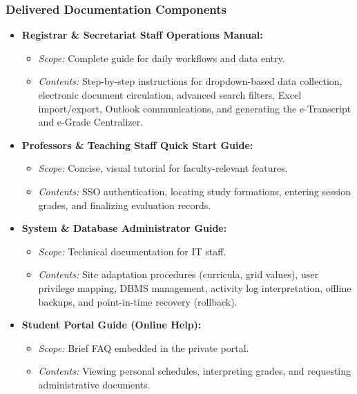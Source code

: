\documentclass[11pt, a4paper]{article}
\begin{document}
\subsubsection{Delivered Documentation Components}
\begin{itemize}
    \item \textbf{Registrar \& Secretariat Staff Operations Manual:}
    \begin{itemize}
        \item \textit{Scope:} Complete guide for daily workflows and data entry.
        \item \textit{Contents:} Step-by-step instructions for dropdown-based data collection, electronic document circulation, advanced search filters, Excel import/export, Outlook communications, and generating the e-Transcript and e-Grade Centralizer.
    \end{itemize}
    \item \textbf{Professors \& Teaching Staff Quick Start Guide:}
    \begin{itemize}
        \item \textit{Scope:} Concise, visual tutorial for faculty-relevant features.
        \item \textit{Contents:} SSO authentication, locating study formations, entering session grades, and finalizing evaluation records.
    \end{itemize}
    \item \textbf{System \& Database Administrator Guide:}
    \begin{itemize}
        \item \textit{Scope:} Technical documentation for IT staff.
        \item \textit{Contents:} Site adaptation procedures (curricula, grid values), user privilege mapping, DBMS management, activity log interpretation, offline backups, and point-in-time recovery (rollback).
    \end{itemize}
    \item \textbf{Student Portal Guide (Online Help):}
    \begin{itemize}
        \item \textit{Scope:} Brief FAQ embedded in the private portal.
        \item \textit{Contents:} Viewing personal schedules, interpreting grades, and requesting administrative documents.
    \end{itemize}
\end{itemize}
\end{document}

